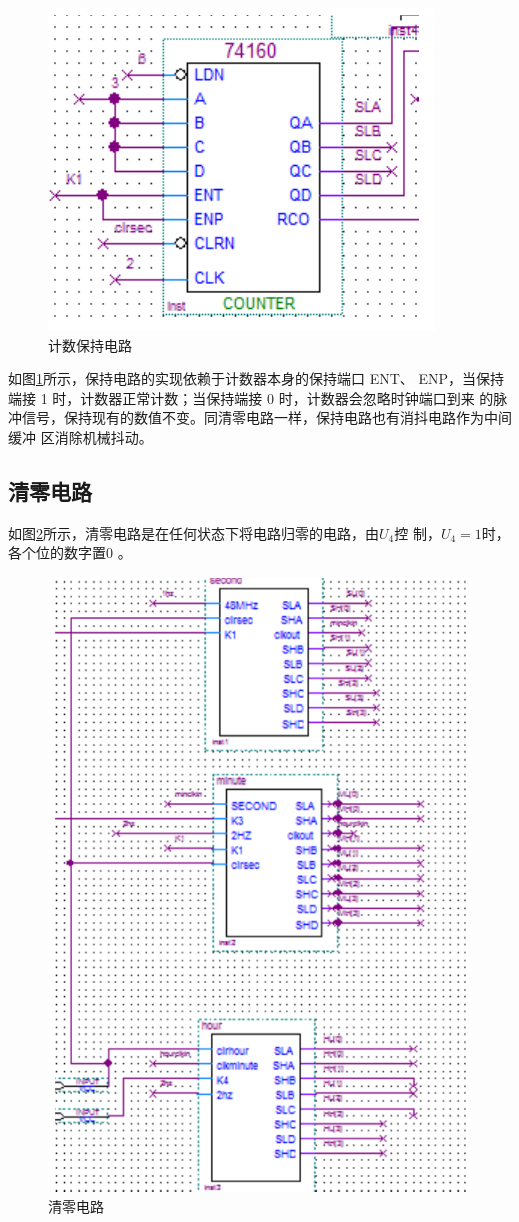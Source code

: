 \documentclass[twoside, openright]{article}
\begin{document}
\begin{figure}
	\centering
	\includegraphics[width = \linewidth]{keep.png}
	\caption{计数保持电路}
	\label{fig:计数保持电路}
	\vspace{-4em}
\end{figure}

如图\ref{fig:计数保持电路}所示，保持电路的实现依赖于计数器本身的保持端口 ENT、
ENP，当保持端接 1 时，计数器正常计数；当保持端接 0 时，计数器会忽略时钟端口到来
的脉冲信号，保持现有的数值不变。同清零电路一样，保持电路也有消抖电路作为中间缓冲
区消除机械抖动。

\subsection{清零电路}%
\label{sub:清零电路}

如图\ref{fig:清零电路}所示，清零电路是在任何状态下将电路归零的电路，由$ U_4 $控
制，$ U_4 = 1 $时，各个位的数字置0 。

\begin{figure}[htbp]
	\centering
	\includegraphics[width = 0.6\linewidth]{clear.png}
	\caption{清零电路}
	\label{fig:清零电路}
\end{figure}
\end{document}
